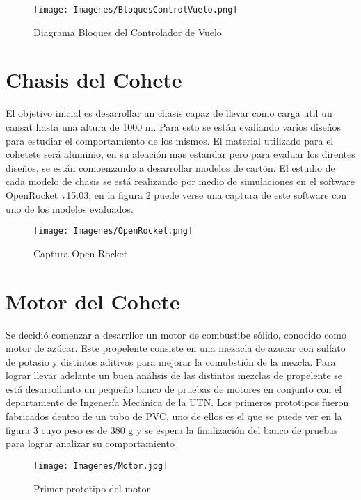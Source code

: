 \documentclass[a4paper]{article} %
\begin{document}
\begin{figure}[!h]
  \centering
    \texttt{[image: Imagenes/BloquesControlVuelo.png]}
  \caption{Diagrama Bloques del Controlador de Vuelo}
  \label{fig:BloquesControlador}
\end{figure}

\section{Chasis del Cohete}
El objetivo inicial es desarrollar un chasis capaz de llevar como carga util un cansat hasta una altura de 1000 m. Para esto se están evaliando varios diseños para estudiar el comportamiento de los mismos. El material utilizado para el cohetete será aluminio, en su aleación mas estandar pero para evaluar los direntes diseños, se están comoenzando a desarrollar modelos de cartón.
El estudio de cada modelo de chasis se está realizando por medio de simulaciones en el software OpenRocket v15.03, en la figura \ref{fig:OpenRocket} puede verse una captura de este software con uno de los modelos evaluados.

\begin{figure}[!h]
  \centering
    \texttt{[image: Imagenes/OpenRocket.png]}
  \caption{Captura Open Rocket}
  \label{fig:OpenRocket}
\end{figure}

\section{Motor del Cohete}
Se decidió comenzar a desarrllor un motor de combustibe sólido, conocido como motor de azúcar. Este propelente consiste en una mezacla de azucar con sulfato de potasio y distintos aditivos para mejorar la comubstión de la mezcla. Para lograr llevar adelante un buen análisis de las distintas mezclas de propelente se está desarrollanto un pequeño banco de pruebas de motores en conjunto con el departamente de Ingenería Mecánica de la UTN.
Los primeros prototipos fueron fabricados dentro de un tubo de PVC, uno de ellos es el que se puede ver en la figura \ref{fig:Motor1} cuyo peso es de 380 g y se espera la finalización del banco de pruebas para lograr analizar su comportamiento

\begin{figure}[!h]
  \centering
    \texttt{[image: Imagenes/Motor.jpg]}
  \caption{Primer prototipo del motor}
  \label{fig:Motor1}
\end{figure}
\end{document}
